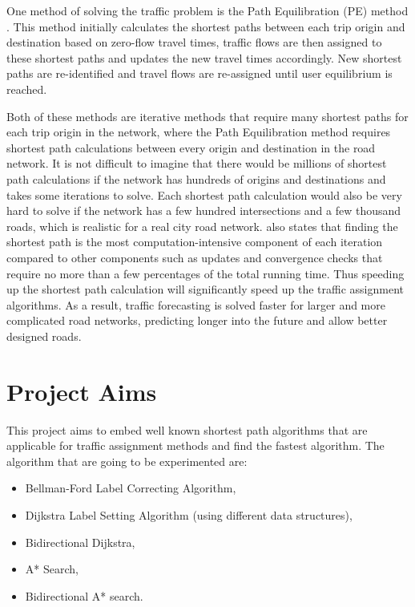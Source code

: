 One method of solving the traffic problem is the Path Equilibration (PE) method \citep{Florian}.
This method initially calculates the shortest paths between each trip origin and destination based on zero-flow travel times, 
traffic flows are then assigned to these shortest paths and updates the new travel times accordingly.
New shortest paths are re-identified and travel flows are re-assigned until
user equilibrium is reached.


Both of these methods are iterative methods that require many shortest paths for each trip origin in the network,
where the Path Equilibration method requires shortest path calculations between every origin and destination in the road network.
It is not difficult to imagine that there would be millions of shortest path calculations if the network has hundreds of origins and destinations and takes some iterations to solve.
Each shortest path calculation would also be very hard to solve if the network has a few hundred intersections and a few thousand roads,
which is realistic for a real city road network.
\citet{Sheffi} also states that finding the shortest path is the most computation-intensive component of each iteration compared to other components such as updates and convergence checks that require no more than a few percentages of the total running time.
Thus speeding up the shortest path calculation will significantly speed up the traffic assignment algorithms.
As a result,
traffic forecasting is solved faster for larger and more complicated road networks, predicting longer into the future and allow better designed roads.

\section{Project Aims}
This project aims to embed well known shortest path algorithms that are applicable for traffic assignment methods and find the fastest algorithm.
The algorithm that are going to be experimented are:
\begin{itemize}
    \item Bellman-Ford Label Correcting Algorithm,
    \item Dijkstra Label Setting Algorithm (using different data structures),
    \item Bidirectional Dijkstra,
    \item A* Search,
    \item Bidirectional A* search.
\end{itemize}


